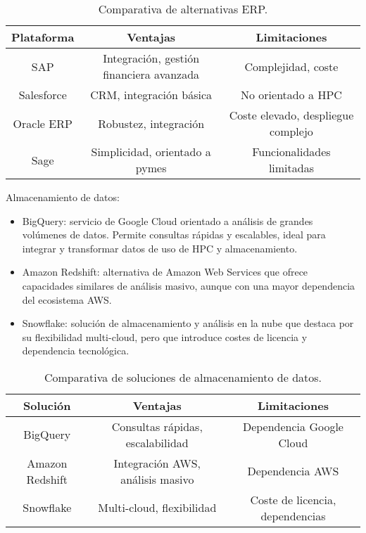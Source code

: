 \begin{table}[H]
    \centering
    \begin{tabular}{|c|c|c|}
        \hline
        \textbf{Plataforma} & \textbf{Ventajas} & \textbf{Limitaciones} \\
        \hline
        SAP & Integración, gestión financiera avanzada & Complejidad, coste \\
        Salesforce & CRM, integración básica & No orientado a HPC \\
        Oracle ERP & Robustez, integración & Coste elevado, despliegue complejo \\
        Sage & Simplicidad, orientado a pymes & Funcionalidades limitadas \\
        \hline
    \end{tabular}
    \caption{Comparativa de alternativas ERP.}
    \label{tab:alternativas_erp}
\end{table}

Almacenamiento de datos:
\begin{itemize}
    \item BigQuery: servicio de Google Cloud orientado a análisis de grandes volúmenes de datos. Permite consultas rápidas y escalables, ideal para integrar y transformar datos de uso de HPC y almacenamiento.
    \item Amazon Redshift: alternativa de Amazon Web Services que ofrece capacidades similares de análisis masivo, aunque con una mayor dependencia del ecosistema AWS.
    \item Snowflake: solución de almacenamiento y análisis en la nube que destaca por su flexibilidad multi-cloud, pero que introduce costes de licencia y dependencia tecnológica.
\end{itemize}

\begin{table}[H]
    \centering
    \begin{tabular}{|c|c|c|}
        \hline
        \textbf{Solución} & \textbf{Ventajas} & \textbf{Limitaciones} \\
        \hline
        BigQuery & Consultas rápidas, escalabilidad & Dependencia Google Cloud \\
        Amazon Redshift & Integración AWS, análisis masivo & Dependencia AWS \\
        Snowflake & Multi-cloud, flexibilidad & Coste de licencia, dependencias \\
        \hline
    \end{tabular}
    \caption{Comparativa de soluciones de almacenamiento de datos.}
    \label{tab:almacenamiento_datos}
\end{table}